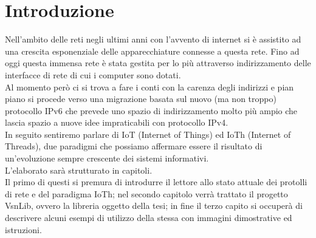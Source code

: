 

\chapter*{Introduzione}                 %


Nell'ambito delle reti negli ultimi anni con l'avvento di internet si \`e assistito ad una crescita esponenziale delle apparecchiature connesse a questa rete.
Fino ad oggi questa immensa rete \`e stata gestita per lo pi\`u attraverso indirizzamento delle interfacce di rete di cui i computer sono dotati.\\
Al momento per\`o ci si trova a fare i conti con la carenza degli indirizzi e pian piano si procede verso una migrazione basata sul nuovo (ma non troppo) protocollo IPv6 che prevede uno spazio di indirizzamento molto pi\`u ampio che lascia spazio a nuove idee impraticabili con protocollo IPv4.\\
In seguito sentiremo parlare di IoT (Internet of Things) ed IoTh (Internet of Threads), due paradigmi che possiamo affermare essere il risultato di un'evoluzione sempre crescente dei sistemi informativi.\\
L'elaborato sarà strutturato in capitoli.\\
Il primo di questi si premura di introdurre il lettore allo stato attuale dei protolli di rete e del paradigma IoTh; nel secondo capitolo verr\`a trattato il progetto VsnLib, ovvero la libreria oggetto della tesi; in fine il terzo capito si occuper\`a di descrivere alcuni esempi di utilizzo della stessa con immagini dimostrative ed istruzioni.
\clearpage{\pagestyle{empty}\cleardoublepage}
\tableofcontents                        %
\rhead[\fancyplain{}{\bfseries\leftmark}]{\fancyplain{}{\bfseries\thepage}}
\clearpage{\pagestyle{empty}\cleardoublepage}
\listoffigures                          %
\clearpage{\pagestyle{empty}\cleardoublepage}
\listoftables                           %
\clearpage{\pagestyle{empty}\cleardoublepage} 

